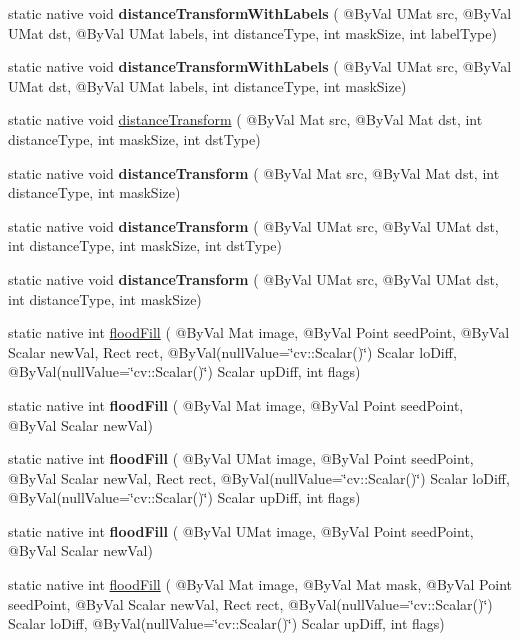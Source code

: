 \begin{DoxyCompactItemize}
\item 
static native void {\bfseries distance\+Transform\+With\+Labels} ( @By\+Val U\+Mat src, @By\+Val U\+Mat dst, @By\+Val U\+Mat labels, int distance\+Type, int mask\+Size, int label\+Type)
\item 
static native void {\bfseries distance\+Transform\+With\+Labels} ( @By\+Val U\+Mat src, @By\+Val U\+Mat dst, @By\+Val U\+Mat labels, int distance\+Type, int mask\+Size)
\item 
static native void \hyperlink{group__imgproc__misc_ga8d767320bf0a4f3bbeebe751dbd2f3d7}{distance\+Transform} ( @By\+Val Mat src, @By\+Val Mat dst, int distance\+Type, int mask\+Size, int dst\+Type)
\item 
static native void {\bfseries distance\+Transform} ( @By\+Val Mat src, @By\+Val Mat dst, int distance\+Type, int mask\+Size)
\item 
static native void {\bfseries distance\+Transform} ( @By\+Val U\+Mat src, @By\+Val U\+Mat dst, int distance\+Type, int mask\+Size, int dst\+Type)
\item 
static native void {\bfseries distance\+Transform} ( @By\+Val U\+Mat src, @By\+Val U\+Mat dst, int distance\+Type, int mask\+Size)
\item 
static native int \hyperlink{group__imgproc__misc_gacd62f4ba0b1bf1f4664bfd1a3dd1bd08}{flood\+Fill} ( @By\+Val Mat image, @By\+Val Point seed\+Point, @By\+Val Scalar new\+Val, Rect rect, @By\+Val(null\+Value=\char`\"{}cv\+::\+Scalar()\char`\"{}) Scalar lo\+Diff, @By\+Val(null\+Value=\char`\"{}cv\+::\+Scalar()\char`\"{}) Scalar up\+Diff, int flags)
\item 
static native int {\bfseries flood\+Fill} ( @By\+Val Mat image, @By\+Val Point seed\+Point, @By\+Val Scalar new\+Val)
\item 
static native int {\bfseries flood\+Fill} ( @By\+Val U\+Mat image, @By\+Val Point seed\+Point, @By\+Val Scalar new\+Val, Rect rect, @By\+Val(null\+Value=\char`\"{}cv\+::\+Scalar()\char`\"{}) Scalar lo\+Diff, @By\+Val(null\+Value=\char`\"{}cv\+::\+Scalar()\char`\"{}) Scalar up\+Diff, int flags)
\item 
static native int {\bfseries flood\+Fill} ( @By\+Val U\+Mat image, @By\+Val Point seed\+Point, @By\+Val Scalar new\+Val)
\item 
static native int \hyperlink{group__imgproc__misc_gae1a712c481241605487f34e3b969f49c}{flood\+Fill} ( @By\+Val Mat image, @By\+Val Mat mask, @By\+Val Point seed\+Point, @By\+Val Scalar new\+Val, Rect rect, @By\+Val(null\+Value=\char`\"{}cv\+::\+Scalar()\char`\"{}) Scalar lo\+Diff, @By\+Val(null\+Value=\char`\"{}cv\+::\+Scalar()\char`\"{}) Scalar up\+Diff, int flags)

\end{DoxyCompactItemize}
